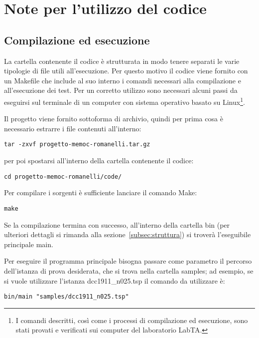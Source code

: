 
\section{Note per l'utilizzo del codice}\label{sec:codice}
\subsection{Compilazione ed esecuzione}\label{subsec:utilizzo}
La cartella contenente il codice è strutturata in modo tenere separati le varie tipologie di file utili all'esecuzione.
Per questo motivo il codice viene fornito con un \textsf{Makefile} che include al suo interno i comandi
necessari alla compilazione e all'esecuzione dei test.
Per un corretto utilizzo sono necessari alcuni passi da eseguirsi sul terminale di un computer con sistema
operativo basato su Linux\footnote{I comandi descritti, così come i processi di compilazione ed esecuzione,
sono stati provati e verificati sui computer del laboratorio LabTA.}.

Il progetto viene fornito sottoforma di archivio, quindi per prima cosa è necessario estrarre i file contenuti all'interno:
\label{lst:make-passo-1}
\begin{lstlisting}[style=BashStyle]
tar -zxvf progetto-memoc-romanelli.tar.gz
\end{lstlisting}
per poi spostarsi all'interno della cartella contenente il codice:
\label{lst:make-passo-2}
\begin{lstlisting}[style=BashStyle]
cd progetto-memoc-romanelli/code/
\end{lstlisting}
%
Per compilare i sorgenti è sufficiente lanciare il comando \textsf{Make}:
\label{lst:make-passo-3}
\begin{lstlisting}[style=BashStyle]
make
\end{lstlisting}
%
Se la compilazione termina con successo, all'interno della cartella \textsf{bin}
(per ulteriori dettagli si rimanda alla sezione~\ref{subsec:struttura}) si troverà l'eseguibile principale \textsf{main}.

Per eseguire il programma principale bisogna passare come parametro
il percorso dell'istanza di prova desiderata, che si trova nella cartella \textsf{samples};
ad esempio, se si vuole utilizzare l'istanza \textsf{dcc1911\_n025.tsp} il comando da utilizzare è:
\label{lst:make-passo-4}
\begin{lstlisting}[style=BashStyle]
bin/main "samples/dcc1911_n025.tsp"
\end{lstlisting}
%
